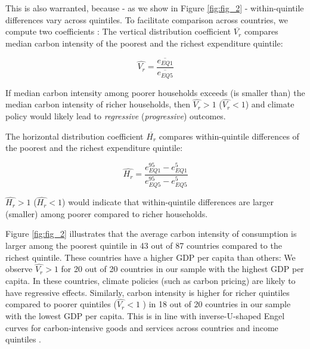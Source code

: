 \documentclass[12pt, a4paper]{article}
\begin{document}
This is also warranted, because - as we show in Figure \ref{fig:fig_2} - within-quintile differences vary across quintiles. To facilitate comparison across countries, we compute two coefficients \autocite{Missbach.2024}: The vertical distribution coefficient $\overline{V_{r}}$ compares median carbon intensity of the poorest and the richest expenditure quintile:

\begin{equation}
    \widehat{V_{r}} = \frac{\overline{e_{EQ1}}}{\overline{e_{EQ5}}}
\end{equation}

If median carbon intensity among poorer households exceeds (is smaller than) the median carbon intensity of richer households, then $\widehat{V_{r}}>1$ ($\widehat{V_{r}}<1$) and climate policy would likely lead to \textit{regressive} (\textit{progressive}) outcomes.

The horizontal distribution coefficient $\overline{H_{r}}$ compares within-quintile differences of the poorest and the richest expenditure quintile:

\begin{equation}
    \widehat{H_{r}} = \frac{e_{EQ1}^{95} - e_{EQ1}^{5}}{e_{EQ5}^{95} - e_{EQ5}^{5}}
\end{equation}

$\widehat{H_{r}}>1$ ($\widehat{H_{r}}<1$) would indicate that within-quintile differences are larger (smaller) among poorer compared to richer households.

Figure \ref{fig:fig_2} illustrates that the average carbon intensity of consumption is larger among the poorest quintile in 43 out of 87 countries compared to the richest quintile. These countries have a higher GDP per capita than others: We observe $\widehat{V_{r}}>1$ for 20 out of 20 countries in our sample with the highest GDP per capita. In these countries, climate policies (such as carbon pricing) are likely to have regressive effects. Similarly, carbon intensity is higher for richer quintiles compared to poorer quintiles ($\widehat{V_{r}}<1$ ) in 18 out of 20 countries in our sample with the lowest GDP per capita. This is in line with inverse-U-shaped Engel curves for carbon-intensive goods and services across countries and income quintiles \autocite{Dorband.2019}. %
\end{document}

